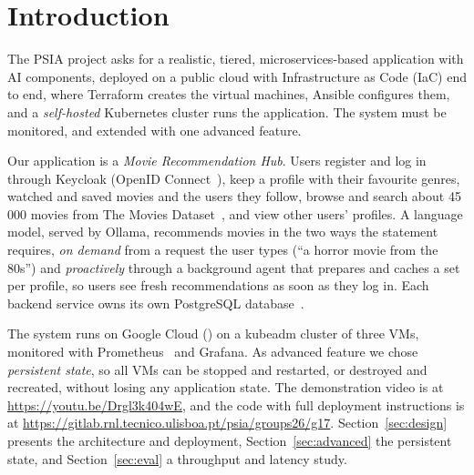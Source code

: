 \section{Introduction}\label{sec:intro}

The PSIA project asks for a realistic, tiered, microservices-based application with AI components, deployed on a public cloud with Infrastructure as Code (IaC) end to end, where Terraform creates the virtual machines, Ansible configures them, and a \emph{self-hosted} Kubernetes cluster runs the application. The system must be monitored, and extended with one advanced feature.

Our application is a \emph{Movie Recommendation Hub}. Users register and log in through Keycloak (OpenID Connect~\cite{oidc}), keep a profile with their favourite genres, watched and saved movies and the users they follow, browse and search about 45\,000 movies from The Movies Dataset~\cite{banik2017movies}, and view other users' profiles. A language model, served by Ollama, recommends movies in the two ways the statement requires, \emph{on demand} from a request the user types (``a horror movie from the 80s'') and \emph{proactively} through a background agent that prepares and caches a set per profile, so users see fresh recommendations as soon as they log in. Each backend service owns its own PostgreSQL database~\cite{richardson-dbps}.

The system runs on Google Cloud () on a kubeadm cluster of three VMs, monitored with Prometheus~\cite{prometheus} and Grafana. As advanced feature we chose \emph{persistent state}, so all VMs can be stopped and restarted, or destroyed and recreated, without losing any application state. The demonstration video is at \url{https://youtu.be/Drgl3k404wE}, and the code with full deployment instructions is at \url{https://gitlab.rnl.tecnico.ulisboa.pt/psia/groups26/g17}. Section~\ref{sec:design} presents the architecture and deployment, Section~\ref{sec:advanced} the persistent state, and Section~\ref{sec:eval} a throughput and latency study.

